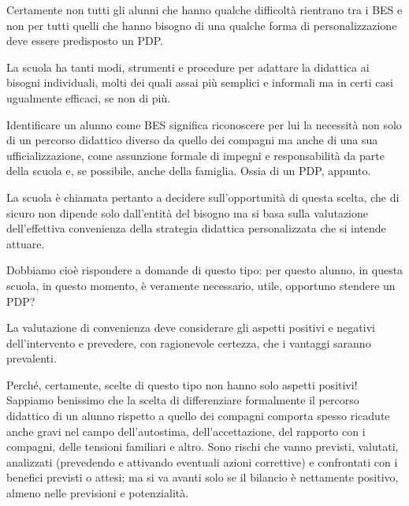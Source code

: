 Certamente non tutti gli alunni che hanno qualche difficoltà rientrano tra i BES e non per tutti quelli che hanno bisogno di una qualche forma di personalizzazione deve essere predisposto un PDP.

La scuola ha tanti modi, strumenti e procedure per adattare la didattica ai bisogni individuali, molti dei quali assai più semplici e informali ma in certi casi ugualmente efficaci, se non di più.

Identificare un alunno come BES significa riconoscere per lui la necessità non solo di un percorso didattico diverso da quello dei compagni ma anche di una sua ufficializzazione, come assunzione formale di impegni e responsabilità da parte della scuola e, se possibile, anche della famiglia. Ossia di un PDP, appunto.


La scuola è chiamata pertanto a decidere sull'opportunità di questa scelta, che di sicuro non dipende solo dall'entità del bisogno ma si basa sulla valutazione dell'effettiva convenienza della strategia didattica personalizzata che si intende attuare.

Dobbiamo cioè rispondere a domande di questo tipo: per questo alunno, in questa scuola, in questo momento, è veramente necessario, utile, opportuno stendere un PDP?

La valutazione di convenienza deve considerare gli aspetti positivi e negativi dell'intervento e prevedere, con ragionevole certezza, che i vantaggi saranno prevalenti.

Perché, certamente, scelte di questo tipo non hanno solo aspetti positivi! Sappiamo benissimo che la scelta di differenziare formalmente il percorso didattico di un alunno rispetto a quello dei compagni comporta spesso ricadute anche gravi nel campo dell'autostima, dell'accettazione, del rapporto con i compagni, delle tensioni familiari e altro. Sono rischi che vanno previsti, valutati, analizzati (prevedendo e attivando eventuali azioni correttive) e confrontati con i benefici previsti o attesi; ma si va avanti solo se il bilancio è nettamente positivo, almeno nelle previsioni e potenzialità.

